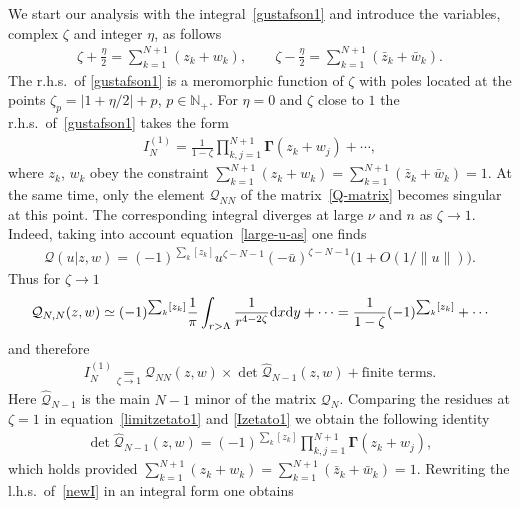 \documentclass[pdftex]{sigma}
\numberwithin{equation}{section}
\begin{document}
We start our analysis with the integral~\eqref{gustafson1} and introduce the variables, complex $\zeta$ and integer $\eta$, as follows
\begin{gather}\label{zeta-wz}
\zeta+\frac{\eta}2=\sum_{k=1}^{N+1} (z_k+w_k) , \qquad
\zeta-\frac{\eta}2=\sum_{k=1}^{N+1} (\bar z_k+\bar w_k).
\end{gather}
The r.h.s.\ of \eqref{gustafson1} is a meromorphic function of $\zeta$ with poles located at the points $\zeta_p=|1+\eta/2|+p$, $p\in \mathbb N_+$. For $\eta=0$ and $\zeta$ close to $1$ the r.h.s.\ of~\eqref{gustafson1} takes the form
\begin{gather}\label{Izetato1}
I_{N}^{(1)}=\frac1{1-\zeta}\prod_{k,j=1}^{N+1}\boldsymbol{\Gamma}(z_k+ w_j) +\cdots ,
\end{gather}
where $z_k$, $w_k$ obey the constraint $\sum\limits_{k=1}^{N+1} (z_k+w_k)=\sum\limits_{k=1}^{N+1} (\bar z_k+\bar w_k)=1$. At the same time, only the element $\mathcal Q_{NN}$ of the matrix~\eqref{Q-matrix} becomes singular at this point. The corresponding integral diverges at large $\nu$ and $n$ as $\zeta \to 1$. Indeed, taking into account
equation~\eqref{large-u-as} one finds
\begin{gather*}
{\mathcal{Q}}(u|z,w) = (-1)^{\sum_k [z_k]} u^{\zeta-N-1} (-\bar u)^{ \zeta-N-1}\big(1+O (1/{\|u\|} )\big).
\end{gather*}
Thus for $\zeta\to 1$
\begin{gather}\label{limitzetato1}
\mathcal Q_{N,N}(z,w) \simeq (-1)^{\sum_k [z_k]}\frac1\pi \int_{r>\Lambda} \frac{1}{ r^{4-2\zeta}} {\rm d}x{\rm d}y +\cdots
=\frac1{1-\zeta} (-1)^{\sum_k [z_k]}+\cdots
\end{gather}
and therefore
\begin{gather*}
I_{N}^{(1)}\underset{\zeta\to 1}{=} \mathcal Q_{NN}(z,w)\times \det\boldsymbol{\widehat{{\mathcal Q}}}_{N-1}(z,w) + \text{finite terms}.
\end{gather*}
%
Here $\boldsymbol{\widehat{{\mathcal Q}}}_{N-1} $ is the main $N-1$ minor of the matrix $\boldsymbol{\mathcal Q}_N$. Comparing the residues at $\zeta=1$ in equation~\eqref{limitzetato1} and \eqref{Izetato1} we obtain the following identity
\begin{gather}\label{newI}
\det\boldsymbol{\widehat{{\mathcal Q}}}_{N-1}(z,w)=
(-1)^{\sum_k [z_k]}\prod_{k,j=1}^{N+1}\boldsymbol{\Gamma}(z_k+ w_j) ,
\end{gather}
which holds provided $\sum\limits_{k=1}^{N+1} (z_k+w_k)=\sum\limits_{k=1}^{N+1} (\bar z_k+\bar w_k)=1$. Rewriting the l.h.s.\ of~\eqref{newI} in an integral form one obtains
\end{document}
